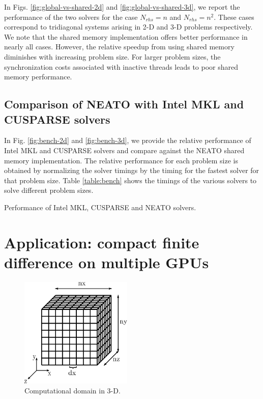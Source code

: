\documentclass{elsarticle}
\begin{document}
In Figs. \ref{fig:global-vs-shared-2d} and \ref{fig:global-vs-shared-3d},
we report the performance of the two solvers for the case
$N_{rhs} = n$ and $N_{rhs} = n^2$.
These cases correspond to tridiagonal systems
arising in 2-D and 3-D problems respectively.
We note that the shared memory implementation
offers better performance in nearly all cases.
However, the relative speedup from using
shared memory diminishes with increasing problem size.
For larger problem sizes,
the synchronization costs associated with inactive threads
leads to poor shared memory performance.

\subsection{Comparison of NEATO with Intel MKL and CUSPARSE solvers}

In Fig. \ref{fig:bench-2d} and \ref{fig:bench-3d},
we provide the relative performance of
Intel MKL and CUSPARSE solvers and compare against
the NEATO shared memory implementation.
The relative performance for
each problem size is obtained by
normalizing the solver timings
by the timing for the fastest solver for that problem size.
Table \ref{table:bench} shows the timings of the various
solvers to solve different problem sizes.

\begin{table}
\scriptsize
\centering
\caption{Performance of Intel MKL, CUSPARSE and NEATO solvers.}
\label{table:bench}

\end{table}

\section{Application: compact finite difference on multiple GPUs}
\label{sec-compact-finite-differences}

\begin{figure}
\begin{center}
\includegraphics[height=150pt]{img/computational-domain.eps}
\caption{Computational domain in 3-D.}
\label{fig:computational-domain}
\end{center}
\end{figure}
\end{document}
